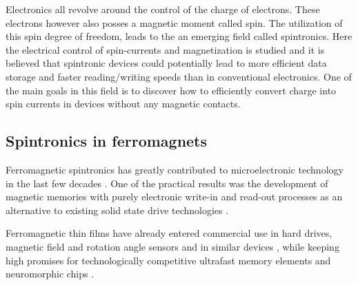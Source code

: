 Electronics all revolve around the control of the charge of electrons. These electrons however also posses a magnetic moment called spin. The utilization of this spin degree of freedom, leads to the an emerging field called spintronics. Here the electrical control of spin-currents and magnetization is studied and it is believed that spintronic devices could potentially lead to more efficient data storage and faster reading/writing speeds than in conventional electronics. One of the main goals in this field is to discover how to efficiently convert charge into spin currents in devices without any magnetic contacts. 




\subsection{Spintronics in ferromagnets}
Ferromagnetic spintronics has greatly contributed to microelectronic technology in the last few decades \cite{bader_spintronics_2010, sinova_new_2012, bhatti_spintronics_2017}. One of the practical results was the development of magnetic memories with purely electronic write-in and read-out processes as an alternative to existing solid state drive technologies \cite{kent_new_2015, sato_two-terminal_2018}.

Ferromagnetic thin films have already entered commercial use in hard drives, magnetic field and rotation angle sensors and in similar devices \cite{Parkin2003,Jogschies2015,Novoselov2019}, while keeping high promises for technologically competitive ultrafast memory elements \cite{Lau2016} and neuromorphic chips \cite{Fukami2016}. 

